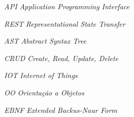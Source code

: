 


\begin{siglas}
    \item[\textit{API}] \textit{Application Programming Interface}
    \item[\textit{REST}] \textit{Representational State Transfer}
    \item[\textit{AST}] \textit{Abstract Syntax Tree}
    \item[\textit{CRUD}] \textit{Create, Read, Update, Delete}
    \item[\textit{IOT}] \textit{Internet of Things}
    \item[\textit{OO}] \textit{Orientação a Objetos}
    \item[\textit{EBNF}] \textit{Extended Backus-Naur Form}
\end{siglas}

